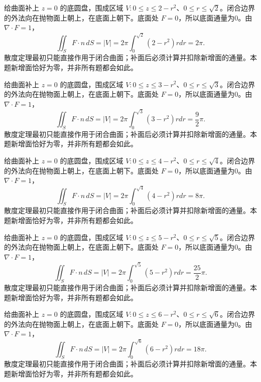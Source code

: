 \documentclass[12pt,fontset=fandol]{ctexart}
\begin{document}
\begin{solve}\label{ans:c44q20}
给曲面补上 $z=0$ 的底圆盘，围成区域 $V:0\le z\le 2-r^2$、$0\le r\le\sqrt{2}$。闭合边界的外法向在抛物面上朝上，在底面上朝下。底面处 $F=0$，所以底面通量为0。由 $\nabla\cdot F=1$，
\[
\iint_SF\cdot n\,dS=|V|=2\pi\int_0^{\sqrt{2}}(2-r^2)rdr=2\pi.
\]
散度定理最初只能直接作用于闭合曲面；补面后必须计算并扣除新增面的通量。本题新增面恰好为零，并非所有题都会如此。
\end{solve}

\begin{solve}\label{ans:c44q21}
给曲面补上 $z=0$ 的底圆盘，围成区域 $V:0\le z\le 3-r^2$、$0\le r\le\sqrt{3}$。闭合边界的外法向在抛物面上朝上，在底面上朝下。底面处 $F=0$，所以底面通量为0。由 $\nabla\cdot F=1$，
\[
\iint_SF\cdot n\,dS=|V|=2\pi\int_0^{\sqrt{3}}(3-r^2)rdr=\frac{9}{2}\pi.
\]
散度定理最初只能直接作用于闭合曲面；补面后必须计算并扣除新增面的通量。本题新增面恰好为零，并非所有题都会如此。
\end{solve}

\begin{solve}\label{ans:c44q22}
给曲面补上 $z=0$ 的底圆盘，围成区域 $V:0\le z\le 4-r^2$、$0\le r\le\sqrt{4}$。闭合边界的外法向在抛物面上朝上，在底面上朝下。底面处 $F=0$，所以底面通量为0。由 $\nabla\cdot F=1$，
\[
\iint_SF\cdot n\,dS=|V|=2\pi\int_0^{\sqrt{4}}(4-r^2)rdr=8\pi.
\]
散度定理最初只能直接作用于闭合曲面；补面后必须计算并扣除新增面的通量。本题新增面恰好为零，并非所有题都会如此。
\end{solve}

\begin{solve}\label{ans:c44q23}
给曲面补上 $z=0$ 的底圆盘，围成区域 $V:0\le z\le 5-r^2$、$0\le r\le\sqrt{5}$。闭合边界的外法向在抛物面上朝上，在底面上朝下。底面处 $F=0$，所以底面通量为0。由 $\nabla\cdot F=1$，
\[
\iint_SF\cdot n\,dS=|V|=2\pi\int_0^{\sqrt{5}}(5-r^2)rdr=\frac{25}{2}\pi.
\]
散度定理最初只能直接作用于闭合曲面；补面后必须计算并扣除新增面的通量。本题新增面恰好为零，并非所有题都会如此。
\end{solve}

\begin{solve}\label{ans:c44q24}
给曲面补上 $z=0$ 的底圆盘，围成区域 $V:0\le z\le 6-r^2$、$0\le r\le\sqrt{6}$。闭合边界的外法向在抛物面上朝上，在底面上朝下。底面处 $F=0$，所以底面通量为0。由 $\nabla\cdot F=1$，
\[
\iint_SF\cdot n\,dS=|V|=2\pi\int_0^{\sqrt{6}}(6-r^2)rdr=18\pi.
\]
散度定理最初只能直接作用于闭合曲面；补面后必须计算并扣除新增面的通量。本题新增面恰好为零，并非所有题都会如此。
\end{solve}
\end{document}
